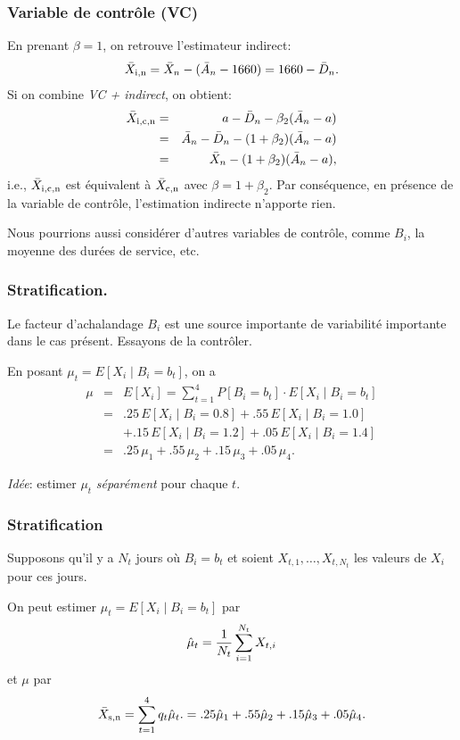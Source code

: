 \documentclass[t,usepdftitle=false]{beamer}
\begin{document}
\begin{frame}
	\frametitle{Variable de contrôle (VC)}
	
	En prenant $\beta=1$, on retrouve l'estimateur indirect:
	\[
	\bar X_{\rm{i},n} = \bar X_n - (\bar A_n - 1660) = 1660 - \bar D_n.
	\]
	Si on combine \emph{VC + indirect}, on obtient:
	\begin{eqnarray*}
		{\bar X_{\rm{i},\rm{c},n}} &=& a - \bar D_n - \beta_2 (\bar A_n - a) \\
		&=& \bar A_n - \bar D_n -(1+\beta_2)(\bar A_n - a) \\
		&=& \bar X_n -(1+\beta_2)(\bar A_n - a),
	\end{eqnarray*}
	i.e., $\bar X_{\rm{i},\rm{c},n}$ est équivalent \`a $\bar X_{\rm{c},n}$ 
	avec $\beta = 1+\beta_2$.
	Par conséquence, en présence de la variable de contrôle, l'estimation indirecte n'apporte rien.
	
	\mbox{}
	
	Nous pourrions aussi considérer d'autres variables de contrôle, comme $B_i$, la moyenne des durées de service, etc.
	
\end{frame}

\begin{frame}
	\frametitle{Stratification.}
	
	Le facteur d'achalandage ${B_i}$ est une source importante de variabilité 
	importante dans le cas présent. Essayons de la contr\^oler.
	
	\mbox{}
	
	En posant $\mu_t = E[X_i\mid B_i=b_t]$, on a
	\begin{eqnarray*}
		\mu &=& E[X_i]  = \sum_{t=1}^4 P[B_i = b_t]\cdot E[X_i\mid B_i=b_t] \\
		&=&  .25\, E[X_i\mid B_i=0.8] + .55\, E[X_i\mid B_i=1.0]  \\
		&& + .15\, E[X_i\mid B_i=1.2] + .05\, E[X_i\mid B_i=1.4]  \\
		&=&  .25\,\mu_1 + .55\, \mu_2 + .15\, \mu_3 + .05\, \mu_4.
	\end{eqnarray*}
	
	\mbox{}
	
	\emph{Idée}: estimer ${\mu_t}$ \emph{séparément} 
	pour chaque $t$.
	
\end{frame}

\begin{frame}
	\frametitle{Stratification}
	
	Supposons qu'il y a ${N_t}$ jours o\`u $B_i = b_t$ et soient
	${X_{t,1}},\dots, {X_{t,N_t}}$ les valeurs de $X_i$ pour ces jours. 
	
	\mbox{}
	
	On peut estimer $\mu_t = E[X_i\mid B_i=b_t]$ par
	$$ {\hat\mu_t} = {1\over N_t} \sum_{i=1}^{N_t} X_{t,i} $$
	et $\mu$ par
	\[
	{\bar X_{\rm{s},n}} = \sum_{t=1}^4 q_t \hat\mu_t.
	= .25 \hat\mu_1 + .55 \hat\mu_2 + .15 \hat\mu_3 + .05 \hat\mu_4.
	\]
	
\end{frame}
\end{document}
